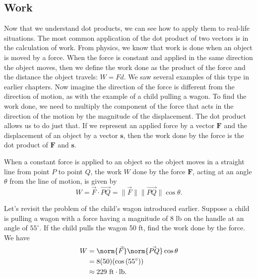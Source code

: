 \documentclass{report}
\begin{document}
    \subsection{Work}
    \bigbreak \noindent 
    Now that we understand dot products, we can see how to apply them to real-life situations. The most common application of the dot product of two vectors is in the calculation of work.
    \bigbreak \noindent 
    From physics, we know that work is done when an object is moved by a force. When the force is constant and applied in the same direction the object moves, then we define the work done as the product of the force and the distance the object travels: $W = Fd$.
    We saw several examples of this type in earlier chapters. Now imagine the direction of the force is different from the direction of motion, as with the example of a child pulling a wagon. To find the work done, we need to multiply the component of the force that acts in the direction of the motion by the magnitude of the displacement. The dot product allows us to do just that. If we represent an applied force by a vector $\mathbf{F}$ and the displacement of an object by a vector $\mathbf{s}$, then the work done by the force is the dot product of $\mathbf{F}$ and $\mathbf{s}$.
    \bigbreak \noindent 
    \begin{dfn}[Work]
        When a constant force is applied to an object so the object moves in a straight line from point $P$ to point $Q$, the work $W$ done by the force $\mathbf{F}$, acting at an angle $\theta$ from the line of motion, is given by
        \[ W = \vec{F} \cdot \overrightarrow{PQ} = \|\vec{F}\| \|\overrightarrow{PQ}\| \cos \theta. \]
    \end{dfn}
    \bigbreak \noindent 
    Let’s revisit the problem of the child’s wagon introduced earlier. Suppose a child is pulling a wagon with a force having a magnitude of 8 lb on the handle at an angle of $55^{\circ}$. If the child pulls the wagon 50 ft, find the work done by the force. 
    \bigbreak \noindent 
    \bigbreak \noindent 
    We have 
    \begin{align*}
        W &= \norm{\vec{F}} \norm{\vec{PQ}}\cos{\theta } \\
       &=8(50)(\cos{(55^{\circ})}) \\
       &\approx 229\ \text{ft} \cdot \text{lb}
    .\end{align*}


    


    



    


    


 

    
\end{document}
